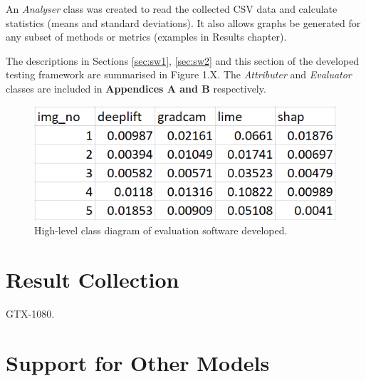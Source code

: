 \documentclass[main]{subfiles}
\begin{document}
An \textit{Analyser} class was created to read the collected CSV data and calculate statistics (means and standard deviations). It also allows graphs be generated for any subset of methods or metrics (examples in Results chapter).

The descriptions in Sections \ref{sec:sw1}, \ref{sec:sw2} and this section of the developed testing framework are summarised in Figure 1.X. The \textit{Attributer} and \textit{Evaluator} classes are included in \textbf{Appendices A and B} respectively.


\begin{figure}[htbp]
\centering
\includegraphics[scale=0.35]{csv_output.png}
\caption{High-level class diagram of evaluation software developed.}
\label{csv_image}
\end{figure}


\newpage
\section{Result Collection}  \label{sec:result_collection}
GTX-1080. 


\section{Support for Other Models}
\end{document}
